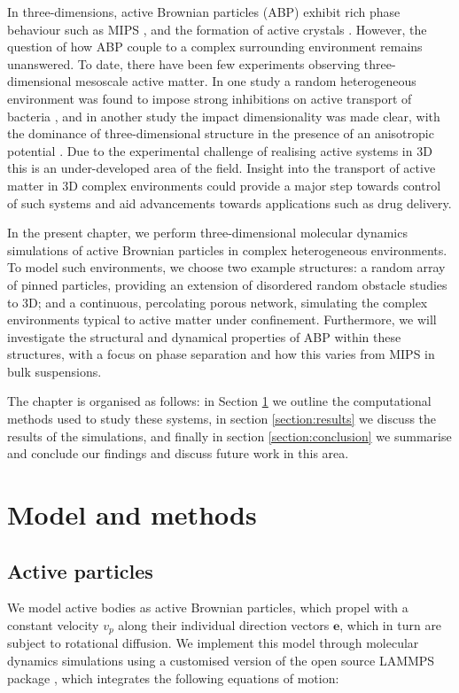 In three-dimensions, active Brownian particles (ABP) exhibit rich phase behaviour such as MIPS \cite{wysocki2014,stenhammar2014}, and the formation of active crystals \cite{omar2021a,moore2021a}. However, the question of how ABP couple to a complex surrounding environment remains unanswered. To date, there have been few experiments observing three-dimensional mesoscale active matter. In one study a random heterogeneous environment was found to impose strong inhibitions on active transport of bacteria \cite{bhattacharjee2019}, and in another study the impact dimensionality was made clear, with the dominance of three-dimensional structure in the presence of an anisotropic potential \cite{sakai2020}. Due to the experimental challenge of realising active systems in 3D this is an under-developed area of the field. Insight into the transport of active matter in 3D complex environments could provide a major step towards control of such systems and aid advancements towards applications such as drug delivery.


In the present chapter, we perform three-dimensional molecular dynamics simulations of active Brownian particles in complex heterogeneous environments. To model such environments, we choose two example structures: a random array of pinned particles, providing an extension of disordered random obstacle studies to 3D; and a continuous, percolating porous network, simulating the complex environments typical to active matter under confinement. Furthermore, we will investigate the structural and dynamical properties of ABP within these structures, with a focus on phase separation and how this varies from MIPS in bulk suspensions.
 
The chapter is organised as follows: in Section \ref{section:methods} we outline the computational methods used to study these systems, in section \ref{section:results} we discuss the results of the simulations, and finally in section \ref{section:conclusion} we summarise and conclude our findings and discuss future work in this area. 

\section{Model and methods}
\label{section:methods}

\subsection{Active particles}

We model active bodies as active Brownian particles, which propel with a constant velocity $v_p$ along their individual direction vectors $\boldsymbol{e}$, which in turn are subject to rotational diffusion. 
We implement this model through molecular dynamics simulations using a customised version of the open source LAMMPS package \cite{moore2021a}, which integrates the following
equations of motion:


